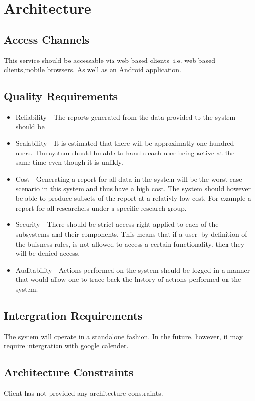 \documentclass{article}
\begin{document}
	\section{Architecture}
		\subsection{Access Channels}
		This service should be accessable via web based clients. i.e. web based clients,mobile browsers. As well as an Android application.

		\subsection{Quality Requirements}
		\begin{itemize}
		  \item Reliability - The reports generated from the data provided to the system should be
		  \item Scalability - It is estimated that there will be approximatly one hundred users. The system should be able to handle each user being active at the same time even though it is unlikly.
		  \item Cost - Generating a report for all data in the system will be the worst case scenario in this system and thus have a high cost. The system should however be able to produce subsets of the report at a relativly low cost. For example a report for all researchers under a specific research group.
		  \item Security - There should be strict access right applied to each of the subsystems and their components. This means that if a user, by definition of the buisness rules, is not allowed to access a certain functionality, then they will be denied access.
		  \item Auditability - Actions performed on the system should be logged in a manner that would allow one to trace back the history of actions performed on the system.
		\end{itemize}

		\subsection{Intergration Requirements}
		The system will operate in a standalone fashion. In the future, however, it may require intergration with google calender.

		\subsection{Architecture Constraints}
		Client has not provided any architecture constraints.
	
\end{document}

